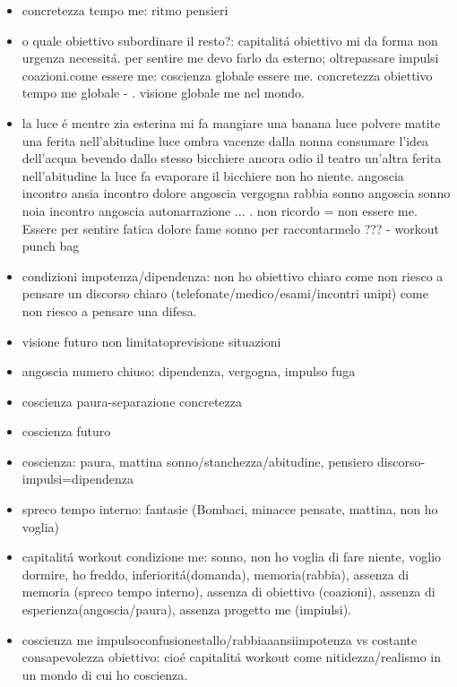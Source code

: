 \begin{itemize}
\item concretezza tempo me: ritmo pensieri
\item \textcolor{red(ryb)}{o quale obiettivo subordinare il resto?}: capitalit\'a obiettivo mi da forma non urgenza necessit\'a. per sentire me devo farlo da esterno; oltrepassare impulsi coazioni.come essere me: coscienza globale essere me. concretezza obiettivo tempo me globale - . visione globale me nel mondo.
\item la luce \'e mentre zia esterina mi fa mangiare una banana luce polvere matite una ferita nell'abitudine luce ombra vacenze dalla nonna consumare l'idea dell'acqua bevendo dallo stesso bicchiere ancora odio il teatro un'altra ferita nell'abitudine la luce fa evaporare il bicchiere non ho niente. angoscia incontro ansia incontro dolore angoscia vergogna rabbia sonno angoscia sonno noia incontro angoscia autonarrazione ... . non ricordo = non essere me.
Essere per sentire fatica dolore fame sonno per raccontarmelo ??? - workout punch bag
\item condizioni impotenza/dipendenza: non ho obiettivo chiaro come non riesco a pensare un discorso chiaro (telefonate/medico/esami/incontri unipi) come non riesco a pensare una difesa. 
\item visione futuro non limitatoprevisione situazioni
\item {} angoscia numero chiuso: dipendenza, vergogna, impulso fuga
\item coscienza paura-separazione concretezza
\item coscienza futuro
\item coscienza: paura, mattina sonno/stanchezza/abitudine, pensiero discorso-impulsi=dipendenza
\item spreco tempo interno: fantasie (Bombaci, minacce pensate, mattina, non ho voglia)
\item capitalit\'a workout condizione me: sonno, non ho voglia di fare niente, voglio dormire, ho freddo, inferiorit\'a(domanda), memoria(rabbia), assenza di memoria (spreco tempo interno), assenza di obiettivo (coazioni), assenza di esperienza(angoscia/paura), assenza progetto me (impiulsi).
\item coscienza me impulsoconfusionestallo/rabbiaaansiimpotenza vs costante consapevolezza obiettivo: cio\'e capitalit\'a workout come nitidezza/realismo in un mondo di cui ho coscienza.

\end{itemize}

